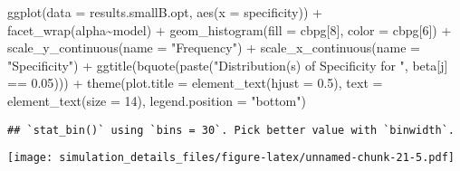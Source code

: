\documentclass[
]{article}
\newenvironment{Shaded}{\begin{snugshade}}{\end{snugshade}}
\newcommand{\AttributeTok}[1]{\textcolor[rgb]{0.77,0.63,0.00}{#1}}
\newcommand{\DecValTok}[1]{\textcolor[rgb]{0.00,0.00,0.81}{#1}}
\newcommand{\FloatTok}[1]{\textcolor[rgb]{0.00,0.00,0.81}{#1}}
\newcommand{\FunctionTok}[1]{\textcolor[rgb]{0.00,0.00,0.00}{#1}}
\newcommand{\NormalTok}[1]{#1}
\newcommand{\SpecialCharTok}[1]{\textcolor[rgb]{0.00,0.00,0.00}{#1}}
\newcommand{\StringTok}[1]{\textcolor[rgb]{0.31,0.60,0.02}{#1}}
\begin{document}
\begin{Shaded}
\begin{Highlighting}[]
\FunctionTok{ggplot}\NormalTok{(}\AttributeTok{data =}\NormalTok{ results.smallB.opt,}
       \FunctionTok{aes}\NormalTok{(}\AttributeTok{x =}\NormalTok{ specificity)) }\SpecialCharTok{+}
  \FunctionTok{facet\_wrap}\NormalTok{(alpha}\SpecialCharTok{\textasciitilde{}}\NormalTok{model) }\SpecialCharTok{+}
  \FunctionTok{geom\_histogram}\NormalTok{(}\AttributeTok{fill =}\NormalTok{ cbpg[}\DecValTok{8}\NormalTok{], }\AttributeTok{color =}\NormalTok{ cbpg[}\DecValTok{6}\NormalTok{]) }\SpecialCharTok{+}
  \FunctionTok{scale\_y\_continuous}\NormalTok{(}\AttributeTok{name =} \StringTok{"Frequency"}\NormalTok{) }\SpecialCharTok{+}
  \FunctionTok{scale\_x\_continuous}\NormalTok{(}\AttributeTok{name =} \StringTok{"Specificity"}\NormalTok{) }\SpecialCharTok{+}
  \FunctionTok{ggtitle}\NormalTok{(}\FunctionTok{bquote}\NormalTok{(}\FunctionTok{paste}\NormalTok{(}\StringTok{"Distribution(s) of Specificity for "}\NormalTok{, beta[j] }\SpecialCharTok{==} \FloatTok{0.05}\NormalTok{))) }\SpecialCharTok{+}
  \FunctionTok{theme}\NormalTok{(}\AttributeTok{plot.title =} \FunctionTok{element\_text}\NormalTok{(}\AttributeTok{hjust =} \FloatTok{0.5}\NormalTok{), }
        \AttributeTok{text =} \FunctionTok{element\_text}\NormalTok{(}\AttributeTok{size =} \DecValTok{14}\NormalTok{),}
        \AttributeTok{legend.position =} \StringTok{"bottom"}\NormalTok{)}
\end{Highlighting}
\end{Shaded}

\begin{verbatim}
## `stat_bin()` using `bins = 30`. Pick better value with `binwidth`.
\end{verbatim}

\texttt{[image: simulation\_details\_files/figure-latex/unnamed-chunk-21-5.pdf]}
\end{document}
